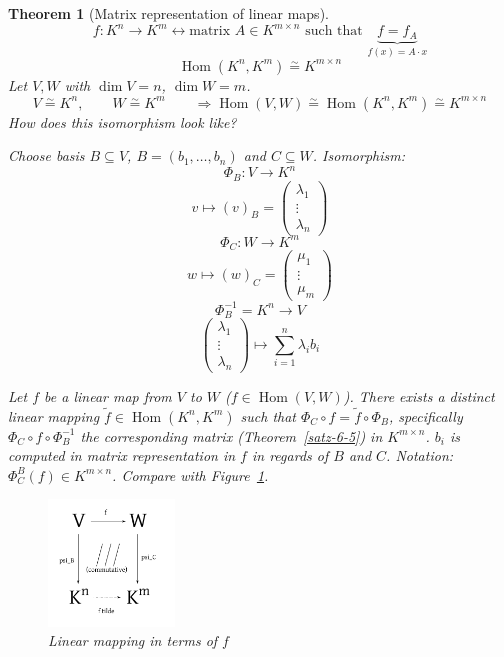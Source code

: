 \documentclass[a4paper,landscape,twocolumn]{article}
\newtheorem{theorem}{Theorem}
\DeclareMathOperator\Hom{Hom} %
\begin{document}
\begin{theorem}[Matrix representation of linear maps]
  \label{satz-6.51}
  \[ f: K^n \to K^m \leftrightarrow \text{matrix } A \in K^{m\times n} \text{ such that } \underbrace{f = f_A}_{f(x) = A \cdot x} \]
  \[ \Hom(K^n,K^m) \overset{\sim}{=} K^{m\times n} \]
  Let $V,W$ with $\dim{V} = n$, $\dim{W} = m$.
  \[
    V \overset{\sim}{=} K^n, \qquad
    W \overset{\sim}{=} K^m \qquad
    \Rightarrow \Hom(V, W) \overset{\sim}{=} \Hom(K^n,K^m) \overset{\sim}{=} K^{m\times n}
  \]
  How does this isomorphism look like?

  Choose basis $B \subseteq V$, $B = (b_1, \ldots, b_n)$ and $C \subseteq W$.
  Isomorphism:
  \[
    \Phi_B: V \to K^n
  \] \[
    v \mapsto (v)_B = \begin{pmatrix} \lambda_1 \\ \vdots \\ \lambda_n \end{pmatrix}
  \] \[
    \Phi_C: W \to K^m
  \] \[
    w \mapsto (w)_C = \begin{pmatrix} \mu_1 \\ \vdots \\ \mu_m \end{pmatrix}
  \] \[
    \Phi_B^{-1} = K^n \to V
  \] \[
    \begin{pmatrix} \lambda_1 \\ \vdots \\ \lambda_n \end{pmatrix}
      \mapsto
      \sum_{i=1}^n \lambda_i b_i
  \]

  Let $f$ be a linear map from $V$ to $W$ ($f \in \Hom(V, W)$).
  There exists a distinct linear mapping $\tilde{f} \in \Hom(K^n,K^m)$
  such that $\Phi_C \circ f = \tilde{f} \circ \Phi_B$, specifically
  $\Phi_C \circ f \circ \Phi_B^{-1}$ the corresponding matrix (Theorem~\ref{satz-6-5})
  in $K^{m\times n}$.
  $b_i$ is computed in matrix representation in $f$ in regards of $B$ and $C$.
  Notation: $\Phi_C^B(f) \in K^{m\times n}$.
  Compare with Figure~\ref{img:lm}.
  \begin{figure}[t]
    \begin{center}
      \includegraphics[width=0.3\textwidth]{img/linear_mapping.pdf}
      \caption{Linear mapping in terms of $f$}
      \label{img:lm}
    \end{center}
  \end{figure}
\end{theorem}
\end{document}
